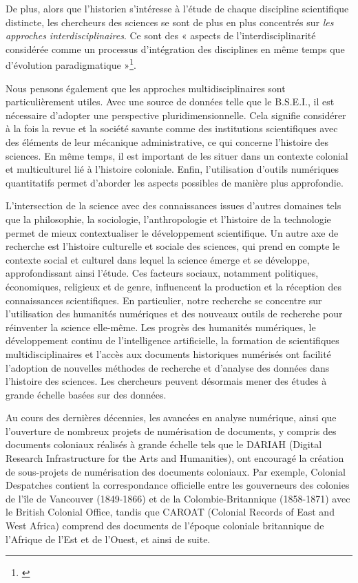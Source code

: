 De plus, alors que l'historien s'intéresse à l'étude de chaque discipline scientifique distincte, les chercheurs des sciences se sont de plus en plus concentrés sur \textit{les approches interdisciplinaires}. Ce sont des « aspects de l’interdisciplinarité considérée comme un processus d’intégration des disciplines en même temps que d’évolution paradigmatique »\footnote{\cite{appro}}.

Nous pensons également que les approches multidisciplinaires sont particulièrement utiles. Avec une source de données telle que le B.S.E.I., il est nécessaire d'adopter une perspective pluridimensionnelle. Cela signifie considérer à la fois la revue et la société savante comme des institutions scientifiques avec des éléments de leur mécanique administrative, ce qui concerne l'histoire des sciences. En même temps, il est important de les situer dans un contexte colonial et multiculturel lié à l'histoire coloniale. Enfin, l'utilisation d'outils numériques quantitatifs permet d'aborder les aspects possibles de manière plus approfondie.

L’intersection de la science avec des connaissances issues d'autres domaines tels que la philosophie, la sociologie, l’anthropologie et l’histoire de la technologie permet de mieux contextualiser le développement scientifique. Un autre axe de recherche est l'histoire culturelle et sociale des sciences, qui prend en compte le contexte social et culturel dans lequel la science émerge et se développe, approfondissant ainsi l'étude. Ces facteurs sociaux, notamment politiques, économiques, religieux et de genre, influencent la production et la réception des connaissances scientifiques. En particulier, notre recherche se concentre sur l'utilisation des humanités numériques et des nouveaux outils de recherche pour réinventer la science elle-même. Les progrès des humanités numériques, le développement continu de l'intelligence artificielle, la formation de scientifiques multidisciplinaires et l'accès aux documents historiques numérisés ont facilité l'adoption de nouvelles méthodes de recherche et d'analyse des données dans l'histoire des sciences. Les chercheurs peuvent désormais mener des études à grande échelle basées sur des données.

Au cours des dernières décennies, les avancées en analyse numérique, ainsi que l'ouverture de nombreux projets de numérisation de documents, y compris des documents coloniaux réalisés à grande échelle tels que le DARIAH (Digital Research Infrastructure for the Arts and Humanities), ont encouragé la création de sous-projets de numérisation des documents coloniaux. Par exemple, Colonial Despatches contient la correspondance officielle entre les gouverneurs des colonies de l'île de Vancouver (1849-1866) et de la Colombie-Britannique (1858-1871) avec le British Colonial Office, tandis que CAROAT (Colonial Records of East and West Africa) comprend des documents de l'époque coloniale britannique de l'Afrique de l'Est et de l'Ouest, et ainsi de suite.

